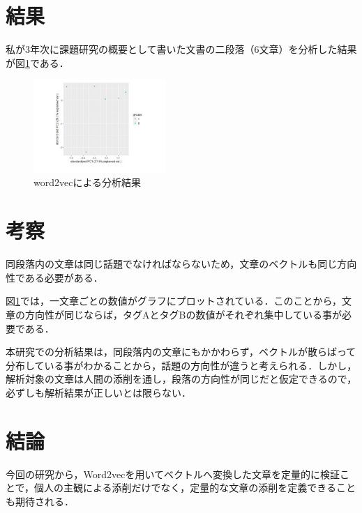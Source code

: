 \documentclass[uplatex,twocolumn,dvipdfmx]{jsarticle}
\begin{document}
\section{結果}
私が3年次に課題研究の概要として書いた文書の二段落（6文章）を分析した結果が図\ref{分析結果}である．
\begin{figure}[h]
\centering
\includegraphics[width=5cm]{02.pdf}
\caption{word2vecによる分析結果}\label{分析結果}
\end{figure}

\section{考察}

同段落内の文章は同じ話題でなければならないため，文章のベクトルも同じ方向性である必要がある．

図\ref{分析結果}では，一文章ごとの数値がグラフにプロットされている．このことから，文章の方向性が同じならば，タグAとタグBの数値がそれぞれ集中している事が必要である．

本研究での分析結果は，同段落内の文章にもかかわらず，ベクトルが散らばって分布している事がわかることから，話題の方向性が違うと考えられる．しかし，解析対象の文章は人間の添削を通し，段落の方向性が同じだと仮定できるので，必ずしも解析結果が正しいとは限らない．

\section{結論}

今回の研究から，Word2vecを用いてベクトルへ変換した文章を定量的に検証ことで，個人の主観による添削だけでなく，定量的な文章の添削を定義できることも期待される．


\end{document}
